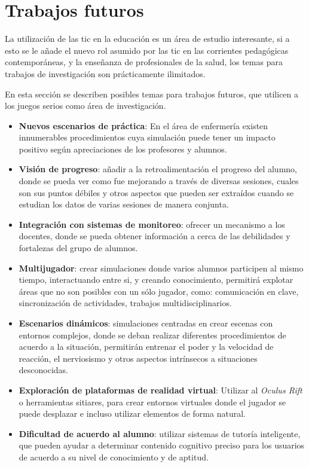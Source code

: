 \section{Trabajos futuros}

La utilización de las \Gls{tic} en la educación es un área de estudio
interesante, si a esto se le añade el nuevo rol asumido por las \Gls{tic} en las
corrientes pedagógicas contemporáneas, y la enseñanza de profesionales de la
salud, los temas para trabajos de investigación son prácticamente ilimitados. 

En esta sección se describen posibles temas para trabajos futuros, que utilicen
a los juegos serios como área de investigación.

\begin{itemize} 
   
\item \textbf{Nuevos escenarios de práctica}: En el área de enfermería existen
    innumerables procedimientos cuya simulación puede tener un impacto positivo
    según apreciaciones de los profesores y alumnos.

\item \textbf{Visión de progreso}: añadir a la retroalimentación el progreso del
    alumno, donde se pueda ver como fue mejorando a través de diversas sesiones,
    cuales son sus puntos débiles y otros aspectos que pueden ser extraídos
    cuando se estudian los datos de varias sesiones de manera conjunta. 

\item \textbf{Integración con sistemas de monitoreo}: ofrecer un mecanismo a los
    docentes, donde se pueda obtener información a cerca de las debilidades y
    fortalezas del grupo de alumnos.

\item \textbf{Multijugador}: crear simulaciones donde varios alumnos participen
    al mismo tiempo, interactuando entre si, y creando conocimiento, permitirá
    explotar áreas que no son posibles con un sólo jugador, como: comunicación
    en clave, sincronización de actividades, trabajos multidisciplinarios.

\item \textbf{Escenarios dinámicos}: simulaciones centradas en crear escenas con
    entornos complejos, donde se deban realizar diferentes procedimientos de
    acuerdo a la situación, permitirán entrenar el poder y la velocidad de
    reacción, el nerviosismo y otros aspectos intrínsecos a situaciones
    desconocidas. 


\item \textbf{Exploración de plataformas de realidad virtual}: Utilizar al
    \emph{Oculus Rift} o herramientas sitiares, para crear entornos virtuales
    donde el jugador se puede desplazar e incluso utilizar elementos de forma
    natural\cite{makerbot,unity:vr}.


\item \textbf{Dificultad de acuerdo al alumno}: utilizar sistemas de tutoría
    inteligente, que pueden ayudar a determinar contenido cognitivo preciso para
    los usuarios de acuerdo a su nivel de conocimiento y de aptitud.


\end{itemize}
